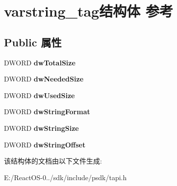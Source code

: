 \hypertarget{structvarstring__tag}{}\section{varstring\+\_\+tag结构体 参考}
\label{structvarstring__tag}
\subsection*{Public 属性}
\begin{DoxyCompactItemize}
\item 
\mbox{\label{structvarstring__tag_af08a495f0c5717a7761ec51eb37b9c78}} 
D\+W\+O\+RD {\bfseries dw\+Total\+Size}
\item 
\mbox{\label{structvarstring__tag_a68dcf579e75067c62d88da242e2acc53}} 
D\+W\+O\+RD {\bfseries dw\+Needed\+Size}
\item 
\mbox{\label{structvarstring__tag_aefc4b65017036beae4f5f323ad00ed71}} 
D\+W\+O\+RD {\bfseries dw\+Used\+Size}
\item 
\mbox{\label{structvarstring__tag_a774d99c99ad9906f8f6675aaad48ea6a}} 
D\+W\+O\+RD {\bfseries dw\+String\+Format}
\item 
\mbox{\label{structvarstring__tag_aa4b3b048cd6d2cb37388affed9c02e6c}} 
D\+W\+O\+RD {\bfseries dw\+String\+Size}
\item 
\mbox{\label{structvarstring__tag_a170910492749d1540dd25778229eefc3}} 
D\+W\+O\+RD {\bfseries dw\+String\+Offset}
\end{DoxyCompactItemize}


该结构体的文档由以下文件生成\+:\begin{DoxyCompactItemize}
\item 
E\+:/\+React\+O\+S-\/0../sdk/include/psdk/tapi.\+h\end{DoxyCompactItemize}

